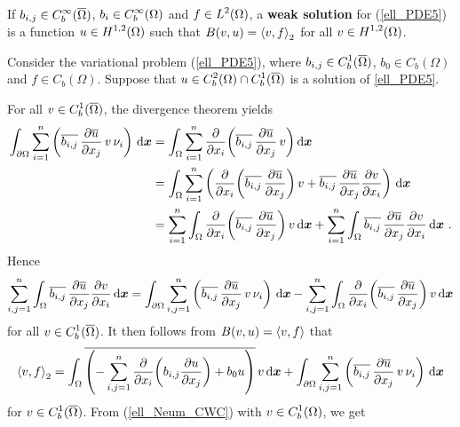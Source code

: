 \begin{defn}
If $\DS b_{i,j} \in C^\infty_b(\overline{\Omega})$,
$\DS b_i \in C^\infty_b(\Omega)$ and
$\DS f \in L^2(\Omega)$,
a {\bfseries weak solution}
for (\ref{ell_PDE5}) is a function
$\DS u \in H^{1,2}(\Omega)$ such that
$\DS B(v,u) = \ps{v}{f}_2$ for all
$\DS v \in H^{1,2}(\Omega)$.
\end{defn}

Consider the variational problem (\ref{ell_PDE5}), where
$\DS b_{i,j}\in C^{1}_b(\overline{\Omega})$, $b_0 \in C_b(\Omega)$ and
$f\in C_b(\Omega)$.  Suppose that
$\DS u \in C^2_b(\Omega)\cap C^1_b(\overline{\Omega})$ is a
solution of \ref{ell_PDE5}.

For all $\DS v \in C^1_b(\overline{\Omega})$, the divergence
theorem yields
\begin{align*}
\int_{\partial \Omega}
\sum_{i=1}^n \left( \overline{b_{i,j}}\,\pdydx{\overline{u}}{x_j}
\,v \, \nu_i \right) \dx{\VEC{x}}
&= \int_\Omega \sum_{i=1}^n \pdfdx{\left( \overline{b_{i,j}}\,
\pdydx{\overline{u}}{x_j} \,v\right)}{x_i} \dx{\VEC{x}} \\
&= \int_\Omega \sum_{i=1}^n \left( \pdfdx{\left( \overline{b_{i,j}}\,
\pdydx{\overline{u}}{x_j}\right)}{x_i} \,v +
\overline{b_{i,j}}\,\pdydx{\overline{u}}{x_j} \pdydx{v}{x_i} \right)
\dx{\VEC{x}} \\
&= \sum_{i=1}^n \int_\Omega \pdfdx{\left( \overline{b_{i,j}}\,
\pdydx{\overline{u}}{x_j}\right)}{x_i} \,v \dx{\VEC{x}}
+ \sum_{i=1}^n \int_\Omega
\overline{b_{i,j}}\,\pdydx{\overline{u}}{x_j} \pdydx{v}{x_i}
\dx{\VEC{x}} \ .
\end{align*}
Hence
\[
\sum_{i,j=1}^n \int_\Omega
\overline{b_{i,j}}\,\pdydx{\overline{u}}{x_j} \pdydx{v}{x_i} \dx{\VEC{x}}
= \int_{\partial \Omega}
\sum_{i,j=1}^n \left( \overline{b_{i,j}}\,\pdydx{\overline{u}}{x_j}
\,v \, \nu_i \right) \dx{\VEC{x}}
- \sum_{i,j=1}^n \int_\Omega \pdfdx{\left( \overline{b_{i,j}}\,
\pdydx{\overline{u}}{x_j}\right)}{x_i} \,v \dx{\VEC{x}} 
\]
for all $\DS v \in C^1_b(\overline{\Omega})$.  It then follows from
$B(v,u) = \ps{v}{f}$ that
\begin{equation} \label{ell_Neum_CWC}
\ps{v}{f}_2 
= \int_\Omega \overline{\left(-
\sum_{i,j=1}^n \pdfdx{\left( b_{i,j} \pdydx{u}{x_j} \right)}{x_i}
+ b_0 u \right)} \, v \dx{\VEC{x}} + \int_{\partial \Omega}
\sum_{i,j=1}^n \left( \overline{b_{i,j}}\,\pdydx{\overline{u}}{x_j}
\,v \, \nu_i \right) \dx{\VEC{x}} 
\end{equation}
for $\DS v \in C^{1}_b(\overline{\Omega})$.
From (\ref{ell_Neum_CWC}) with $\DS v \in C^1_b(\Omega)$, we get
